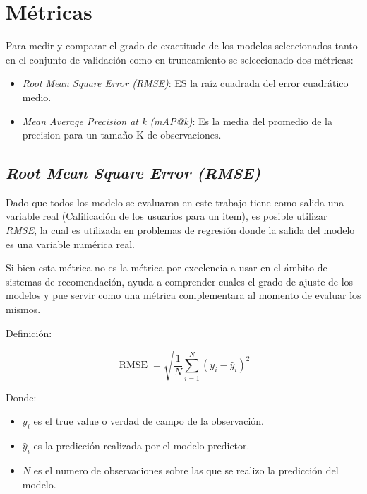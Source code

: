 \documentclass[11pt,a4paper,twoside]{thesis}
\begin{document}
{\section{Métricas}

Para medir y comparar el grado de exactitude de los modelos seleccionados tanto
en el conjunto de validación como en truncamiento se seleccionado dos métricas:

\begin{itemize}
	\item \textit{Root Mean Square Error (RMSE)}: ES la raíz cuadrada del error cuadrático medio.
	\item \textit{Mean Average Precision at k (mAP@k)}: Es la media del promedio de la precision  para un tamaño K de observaciones.
\end{itemize}

\subsection{\textit{Root Mean Square Error (RMSE)}}

Dado que todos los modelo se evaluaron en este trabajo tiene como salida una
variable real (Calificación de los usuarios para un item), es posible utilizar
\textit{RMSE}, la cual es utilizada en problemas de regresión donde la salida
del modelo es una variable numérica real.

Si bien esta métrica no es la métrica por excelencia a usar en el ámbito de
sistemas de recomendación, ayuda a comprender cuales el grado de ajuste de los
modelos y pue servir como una métrica complementara al momento de evaluar los
mismos.

\begin{description}
	\item[Definición:]
\end{description}
\begin{equation}
	\operatorname{RMSE}=\sqrt{  \frac{1}{N} \sum_{i=1}^N (y_i - \hat y_i)^2}
\end{equation}
\begin{description}
	\item[Donde:]
\end{description}
\begin{itemize}
	\item $y_i$ es el true value o verdad de campo de la observación.
	\item $\hat y_i$ es la predicción realizada por el modelo predictor.
	\item $N$ es el numero de observaciones sobre las que se realizo la predicción del modelo.
\end{itemize}

}
\end{document}
